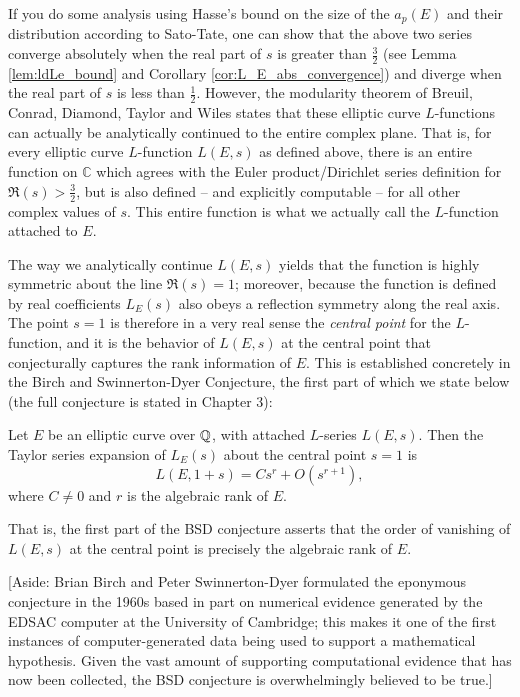 If you do some analysis using Hasse's bound on the size of the $a_p(E)$ and their distribution according to Sato-Tate, one can show that the above two series converge absolutely when the real part of $s$ is greater than $\frac{3}{2}$ (see Lemma \ref{lem:ldLe_bound} and Corollary \ref{cor:L_E_abs_convergence}) and diverge when the real part of $s$ is less than $\frac{1}{2}$. However, the modularity theorem of Breuil, Conrad, Diamond, Taylor and Wiles \cite{BCDT-2011} \cite{TaWi-1995} \cite{Wil-1995} states that these elliptic curve $L$-functions can actually be analytically continued to the entire complex plane. That is, for every elliptic curve $L$-function $L(E,s)$ as defined above, there is an entire function on $\mathbb{C}$ which agrees with the Euler product/Dirichlet series definition for $\Re(s)>\frac{3}{2}$, but is also defined -- and explicitly computable -- for all other complex values of $s$. This entire function is what we actually call the $L$-function attached to $E$.

The way we analytically continue $L(E,s)$ yields that the function is highly symmetric about the line $\Re(s)=1$; moreover, because the function is defined by real coefficients $L_E(s)$ also obeys a reflection symmetry along the real axis. The point $s=1$ is therefore in a very real sense the {\it central point} for the $L$-function, and it is the behavior of $L(E,s)$ at the central point that conjecturally captures the rank information of $E$. This is established concretely in the Birch and Swinnerton-Dyer Conjecture, the first part of which we state below (the full conjecture is stated in Chapter 3):

\begin{conjecture}
Let $E$ be an elliptic curve over $\mathbb{Q}$, with attached $L$-series $L(E,s)$. Then the Taylor series expansion of $L_E(s)$ about the central point $s=1$ is
\begin{equation}
L(E,1+s) = Cs^r  + O(s^{r+1}),
\end{equation}
where
$C \ne 0$ and $r$ is the algebraic rank of $E$.
\end{conjecture}
That is, the first part of the BSD conjecture asserts that the order of vanishing of $L(E,s)$ at the central point is precisely the algebraic rank of $E$.

[Aside: Brian Birch and Peter Swinnerton-Dyer formulated the eponymous conjecture in the 1960s based in part on numerical evidence generated by the EDSAC computer at the University of Cambridge; this makes it one of the first instances of computer-generated data being used to support a mathematical hypothesis. Given the vast amount of supporting computational evidence that has now been collected, the BSD conjecture is overwhelmingly believed to be true.]

